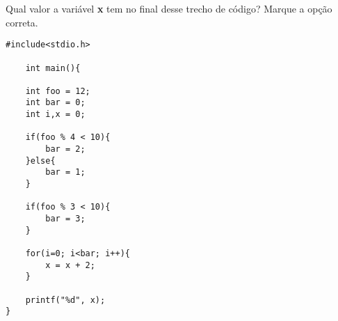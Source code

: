 
\question[10]

Qual valor a variável \textbf{x} tem no final desse trecho de código? Marque a opção correta.

\begin{lstlisting}
#include<stdio.h>

	int main(){
	
	int foo = 12;
	int bar = 0;
	int i,x = 0;
	
	if(foo % 4 < 10){
		bar = 2;
	}else{
		bar = 1;
	}
	
	if(foo % 3 < 10){
		bar = 3;
	}
	
	for(i=0; i<bar; i++){
		x = x + 2;
	}
	
	printf("%d", x);
}
\end{lstlisting}

\begin{choices}
\end{choices}
